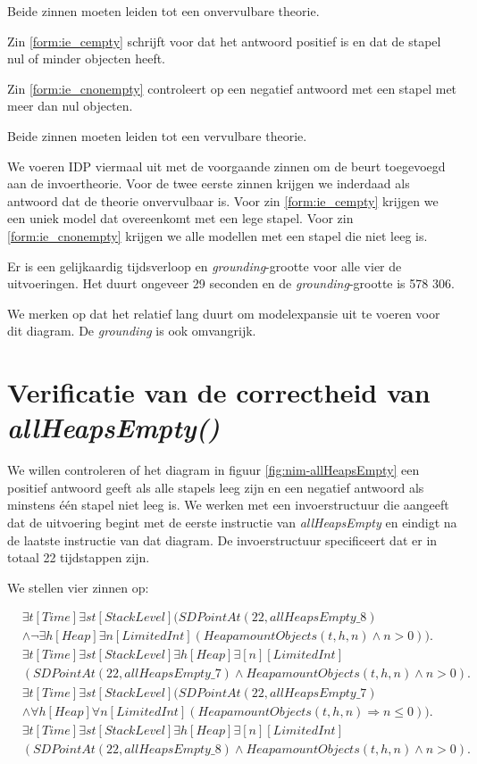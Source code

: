 Beide zinnen moeten leiden tot een onvervulbare theorie.

Zin \ref{form:ie_cempty} schrijft voor dat het antwoord positief is en dat de stapel nul of minder objecten heeft.

Zin \ref{form:ie_cnonempty} controleert op een negatief antwoord met een stapel met meer dan nul objecten.

Beide zinnen moeten leiden tot een vervulbare theorie.

We voeren IDP viermaal uit met de voorgaande zinnen om de beurt toegevoegd aan de invoertheorie. Voor de twee eerste zinnen krijgen we inderdaad als antwoord dat de theorie onvervulbaar is. Voor zin \ref{form:ie_cempty} krijgen we een uniek model dat overeenkomt met een lege stapel. Voor zin \ref{form:ie_cnonempty} krijgen we alle modellen met een stapel die niet leeg is.

Er is een gelijkaardig tijdsverloop en \textit{grounding}-grootte voor alle vier de uitvoeringen. Het duurt ongeveer 29 seconden en de \textit{grounding}-grootte is 578 306.

We merken op dat het relatief lang duurt om modelexpansie uit te voeren voor dit diagram. De \textit{grounding} is ook omvangrijk.

\section{Verificatie van de correctheid van \textit{allHeapsEmpty()}}

We willen controleren of het diagram in figuur \ref{fig:nim-allHeapsEmpty} een positief antwoord geeft als alle stapels leeg zijn en een negatief antwoord als minstens \'e\'en stapel niet leeg is. We werken met een invoerstructuur die aangeeft dat de uitvoering begint met de eerste instructie van \textit{allHeapsEmpty} en eindigt na de laatste instructie van dat diagram. De invoerstructuur specificeert dat er in totaal 22 tijdstappen zijn.

We stellen vier zinnen op:

\begin{align}
	\nonumber&\exists{t}[Time]\exists{st}[StackLevel](SDPointAt(22, allHeapsEmpty\_8) \\ &\land \lnot\exists{h}[Heap]\exists{n}[LimitedInt](HeapamountObjects(t, h, n) \land n > 0)).\label{form:ahe_fnonempty} \\
	\nonumber&\exists{t}[Time]\exists{st}[StackLevel]\exists{h}[Heap]\exists[n][LimitedInt] \\ &(SDPointAt(22, allHeapsEmpty\_7) \land HeapamountObjects(t, h, n) \land n > 0).\label{form:ahe_fempty} \\
	\nonumber&\exists{t}[Time]\exists{st}[StackLevel](SDPointAt(22, allHeapsEmpty\_7) \\ &\land \forall{h}[Heap]\forall{n}[LimitedInt](HeapamountObjects(t, h, n) \Rightarrow n \leq 0)).\label{form:ahe_cempty} \\
	\nonumber&\exists{t}[Time]\exists{st}[StackLevel]\exists{h}[Heap]\exists[n][LimitedInt] \\ &(SDPointAt(22, allHeapsEmpty\_8) \land HeapamountObjects(t, h, n) \land n > 0).\label{form:ahe_cnonempty}
\end{align}


